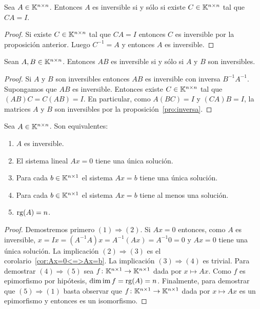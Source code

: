 \begin{cor}
	\label{cor:inversa}
	Sea $A\in\mathbb{K}^{n\times n}$. Entonces $A$ es inversible si y sólo si
	existe $C\in\mathbb{K}^{n\times n}$ tal que $CA=I$.

	\begin{proof}
		Si existe $C\in\mathbb{K}^{n\times n}$ tal que $CA=I$ entonces $C$ es
		inversible por la proposición anterior.  Luego $C^{-1}=A$ y
		entonces $A$ es inversible.  
	\end{proof}
\end{cor}

\begin{cor}
	Sean $A,B\in\mathbb{K}^{n\times n}$. Entonces $AB$ es inversible si y sólo si $A$ y
	$B$ son inversibles.

	\begin{proof}
		Si $A$ y $B$ son inversibles entonces $AB$ es inversible con inversa
		$B^{-1}A^{-1}$.  Supongamos que $AB$ es inversible.  Entonces existe
		$C\in\mathbb{K}^{n\times n}$ tal que $(AB)C=C(AB)=I$. En particular, como
		$A(BC)=I$ y $(CA)B=I$, la matrices $A$ y $B$ son inversibles por la
		proposición~\ref{pro:inversa}.
	\end{proof}
\end{cor}

\begin{prop}
	Sea $A\in\mathbb{K}^{n\times n}$. Son equivalentes:
	\begin{enumerate}
		\item $A$ es inversible.
		\item El sistema lineal $Ax=0$ tiene una única solución.
		\item Para cada $b\in\mathbb{K}^{n\times 1}$ el sistema $Ax=b$ tiene una única solución.
		\item Para cada $b\in\mathbb{K}^{n\times 1}$ el sistema $Ax=b$ tiene al menos una solución.
        \item $\operatorname{rg}(A)=n$. 
	\end{enumerate}

	\begin{proof}
        Demostremos primero $(1)\Rightarrow(2)$. Si $Ax=0$ entonces, como $A$
        es inversible, $x=Ix=(A^{-1}A)x=A^{-1}(Ax)=A^{-1}0=0$ y $Ax=0$ tiene
        una única solución. La implicación $(2)\Rightarrow(3)$ es el
        corolario~\ref{cor:Ax=0<=>Ax=b}.  La implicación $(3)\Rightarrow(4)$ es
        trivial. Para demostrar $(4)\Rightarrow(5)$ sea
        $f\colon\mathbb{K}^{n\times1}\to\mathbb{K}^{n\times1}$ dada por $x\mapsto Ax$. Como $f$
        es epimorfismo por hipótesis, $\dim\operatorname{im} f=\operatorname{rg}(A)=n$. Finalmente, para
        demostrar que $(5)\Rightarrow(1)$ basta observar que
        $f\colon\mathbb{K}^{n\times1}\to\mathbb{K}^{n\times1}$ dada por $x\mapsto Ax$ es un
        epimorfismo y entonces es un isomorfismo.
	\end{proof}
\end{prop}

